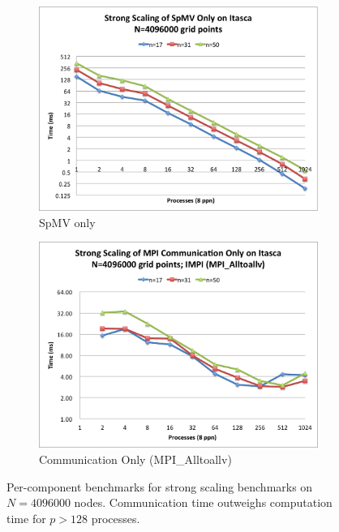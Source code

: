 \documentclass{report}
\begin{document}
\begin{figure} 
\centering
\begin{subfigure}{0.48\textwidth}
\centering
\includegraphics[width=\textwidth]{performance_content/scaling/strong_scaling_4M_regular_spmvOnly.png}
\caption{SpMV only}
\label{fig:strong_scaling_spmv_only_alltoallv_all_stencils}
\end{subfigure}
\begin{subfigure}{0.48\textwidth}
\centering
\includegraphics[width=\textwidth]{performance_content/scaling/strong_scaling_4M_regular_alltoallv_commOnly.png} \caption{Communication Only (MPI\_Alltoallv)}
\label{fig:strong_scaling_comm_only_alltoallv_all_stencils}
\end{subfigure}
\caption{Per-component benchmarks for strong scaling benchmarks on $N=4096000$ nodes. Communication time outweighs computation time for $p>128$ processes.  }
\end{figure}
\end{document}
